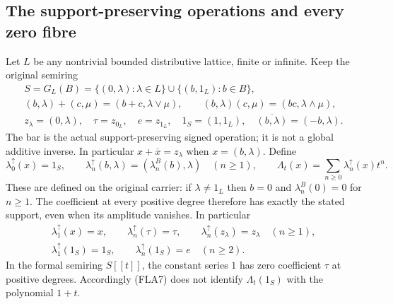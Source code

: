 \subsection{The support-preserving operations and every zero fibre}

Let $L$ be any nontrivial bounded distributive lattice, finite or
infinite. Keep the original semiring
\begin{equation}\tag{FLA5}
 \begin{gathered}
 S=G_L(B)=\{(0,\lambda):\lambda\in L\}
                  \cup\{(b,1_L):b\in B\},\\
 (b,\lambda)+(c,\mu)=(b+c,\lambda\vee\mu),\qquad
 (b,\lambda)(c,\mu)=(bc,\lambda\wedge\mu),\\
 z_\lambda=(0,\lambda),\quad \tau=z_{0_L},\quad e=z_{1_L},
 \quad 1_S=(1,1_L),\quad \overline{(b,\lambda)}=(-b,\lambda).
 \end{gathered}
\end{equation}
The bar is the actual support-preserving signed operation; it is
not a global additive inverse. In particular
$x+\overline x=z_\lambda$ when $x=(b,\lambda)$.
Define
\begin{equation}\tag{FLA6}
 \lambda_0^{\uparrow}(x)=1_S,\qquad
 \lambda_n^{\uparrow}(b,\lambda)
        =(\lambda_n^B(b),\lambda)\quad(n\ge1),\qquad
 \Lambda_t(x)=\sum_{n\ge0}\lambda_n^{\uparrow}(x)t^n.
\end{equation}
These are defined on the original carrier: if $\lambda\ne1_L$
then $b=0$ and $\lambda_n^B(0)=0$ for $n\ge1$. The coefficient
at every positive degree therefore has exactly the stated support,
even when its amplitude vanishes. In particular
\begin{equation}\tag{FLA7}
 \begin{gathered}
 \lambda_1^{\uparrow}(x)=x,\qquad
 \lambda_n^{\uparrow}(\tau)=\tau,\qquad
 \lambda_n^{\uparrow}(z_\lambda)=z_\lambda\quad(n\ge1),\\
 \lambda_1^{\uparrow}(1_S)=1_S,\qquad
 \lambda_n^{\uparrow}(1_S)=e\quad(n\ge2).
 \end{gathered}
\end{equation}
In the formal semiring $S[[t]]$, the constant series $1$ has zero
coefficient $\tau$ at positive degrees. Accordingly (FLA7) does
not identify $\Lambda_t(1_S)$ with the polynomial $1+t$.

